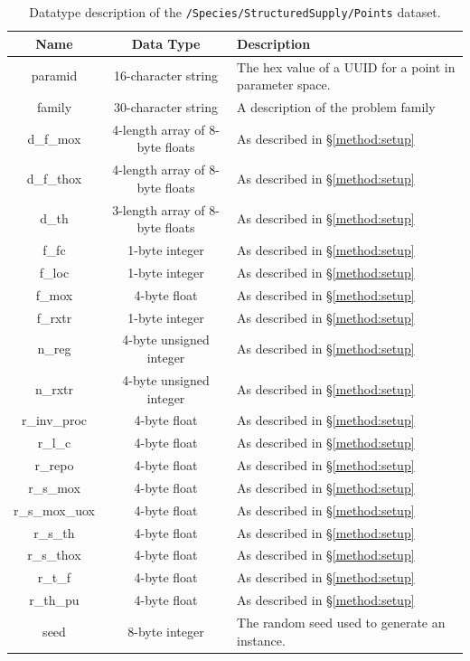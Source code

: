 \begin{table}[h!]
\centering
\caption{\label{tbl:/Species/StructuredSupply/Points}
Datatype description of the \lstinline[basicstyle=\ttfamily\color{black}]|/Species/StructuredSupply/Points| dataset.}
\begin{tabularx}{\columnwidth-10pt}{|c|c|X|} %
\hline
\textbf{Name} & \textbf{Data Type} & \textbf{Description}       \\ \hline
paramid & 16-character string & The hex value of a UUID for a point in parameter space. \\ \hline
family & 30-character string & A description of the problem family \\ \hline
d\_f\_mox & 4-length array of 8-byte floats & As described in \S \ref{method:setup} \\ \hline
d\_f\_thox & 4-length array of 8-byte floats & As described in \S \ref{method:setup} \\ \hline
d\_th & 3-length array of 8-byte floats & As described in \S \ref{method:setup} \\ \hline
f\_fc & 1-byte integer & As described in \S \ref{method:setup} \\ \hline
f\_loc & 1-byte integer & As described in \S \ref{method:setup} \\ \hline
f\_mox & 4-byte float & As described in \S \ref{method:setup} \\ \hline
f\_rxtr & 1-byte integer & As described in \S \ref{method:setup} \\ \hline
n\_reg & 4-byte unsigned integer & As described in \S \ref{method:setup} \\ \hline
n\_rxtr & 4-byte unsigned integer & As described in \S \ref{method:setup} \\ \hline
r\_inv\_proc & 4-byte float & As described in \S \ref{method:setup} \\ \hline
r\_l\_c & 4-byte float & As described in \S \ref{method:setup} \\ \hline
r\_repo & 4-byte float & As described in \S \ref{method:setup} \\ \hline
r\_s\_mox & 4-byte float & As described in \S \ref{method:setup} \\ \hline
r\_s\_mox\_uox & 4-byte float & As described in \S \ref{method:setup} \\ \hline
r\_s\_th & 4-byte float & As described in \S \ref{method:setup} \\ \hline
r\_s\_thox & 4-byte float & As described in \S \ref{method:setup} \\ \hline
r\_t\_f & 4-byte float & As described in \S \ref{method:setup} \\ \hline
r\_th\_pu & 4-byte float & As described in \S \ref{method:setup} \\ \hline
seed & 8-byte integer & The random seed used to generate an instance. \\ \hline
\end{tabularx}
\end{table}

